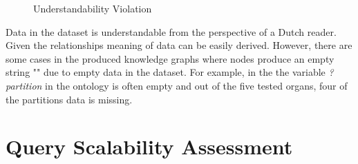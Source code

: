 \begin{figure}[H]
\begin{center}
\end{center}
\vspace{-0.5cm}
\caption{Understandability Violation}
\end{figure}

Data in the dataset is understandable from the perspective of a Dutch reader. Given the relationships meaning of data can be easily derived. However, there are some cases in the produced knowledge graphs where nodes produce an empty string "" due to empty data in the dataset. For example, in the the variable \textit{?partition} in the ontology is often empty and out of the five tested organs, four of the partitions data is missing. 

\section{Query Scalability Assessment}

